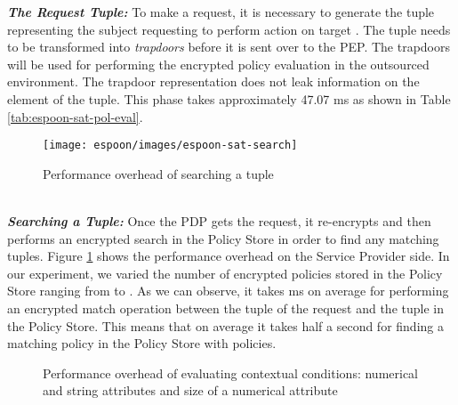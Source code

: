 \documentclass[epsfig,a4paper,11pt,titlepage]{book}
\numberwithin{algorithm}{chapter}
\begin{document}
\noindent \emph{\textbf{The  Request Tuple:}}
To make a request, it is necessary to generate the  tuple representing the subject  requesting to perform action  on target . The  tuple needs to be transformed into \emph{trapdoors} before it is sent over to the \gls{PEP}. The trapdoors will be used for performing the encrypted policy evaluation in the outsourced environment. The trapdoor representation does not leak information on the element of the  tuple. This phase takes approximately 47.07 \gls{ms} as shown in Table \ref{tab:espoon-sat-pol-eval}.

\begin{figure}[htp]
\centering
\texttt{[image: espoon/images/espoon-sat-search]}
\caption{Performance overhead of searching a  tuple}
\label{fig:espoon-sat-search}
\end{figure}
\noindent \\
\noindent \emph{\textbf{Searching a  Tuple:}}
Once the \gls{PDP} gets the request, it re-encrypts and then performs an encrypted search in the Policy Store in order to find any matching  tuples. Figure \ref{fig:espoon-sat-search} shows the performance overhead on the Service Provider side. In our experiment, we varied the number of encrypted policies stored in the Policy Store ranging from  to . As we can observe, it takes  \gls{ms} on average for performing an encrypted match operation between the  tuple of the request and the  tuple in the Policy Store. This means that on average it takes half a second for finding a matching policy in the Policy Store with  policies.


\begin{figure} [htp]
\centering
{}
\caption[Performance overhead of evaluating contextual conditions]{Performance overhead of evaluating contextual conditions:  numerical and string attributes and  size of a numerical attribute}
\label{fig:erbac-policy-evaluation-context}
\end{figure}
\end{document}
